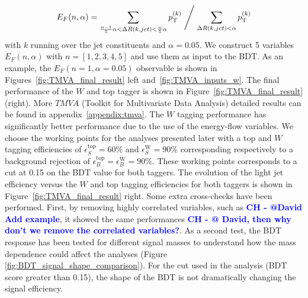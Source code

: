 \documentclass[a4paper,11pt]{article}
\newcommand{\CH}[1] {\textbf{\textcolor{blue}{CH - #1}}}
\newcommand{\ptSup}[1]{\ensuremath{p_{\text{T}}^{#1}}}
\begin{document}
\begin{equation}
E_{F}(n,\alpha) =  \sum \limits_{\frac{n-1}{5}\alpha < \Delta R(k,jet)< \frac{n}{5}\alpha} \ptSup{(k)} \Biggm/ \sum \limits_{\Delta R(k,jet)< \alpha} \ptSup{(k)}
\end{equation}
with $k$ running over the jet constituents and $\alpha=0.05$. We construct 5 variables $E_{F}(n,\alpha)$ with $n=[1,2,3,4,5]$ and use them as input to the BDT.
As an example, the $E_{F}(n=1,\alpha=0.05)$ observable is shown in Figures~\ref{fig:TMVA_final_result} left and~\ref{fig:TMVA_inputs_w}.
The final performance of the $W$ and top tagger is shown in Figure~\ref{fig:TMVA_final_result} (right). More $TMVA$ (Toolkit for Multivariate Data Analysis) detailed results can be found in appendix~\ref{appendix:tmva}.
The $W$ tagging performance has significantly better performance due to the use of the energy-flow variables. We choose the working points for the analyses presented later with a top and $W$ tagging efficiencies of $\epsilon_S^{\text{top}}=60\%$ and $\epsilon_S^{\text{W}}=90\%$ corresponding respectively to a background rejection of $\epsilon_B^{\text{top}}=\epsilon_B^{\text{W}}=90\%$. These working points corresponds to a cut at 0.15 on the BDT value for both taggers. The evolution of the light jet efficiency versus the $W$ and top tagging efficiencies for both taggers is shown in Figure~\ref{fig:TMVA_final_result} right.
\newline
Some extra cross-checks have been performed. First, by removing highly correlated variables, such as \CH{@David Add example}, it showed the same performances \CH{@ David, then why don't we remove the correlated variables?}.
As a second test, the BDT response has been tested for different signal masses to understand how the mass dependence could affect the analyses (Figure \ref{fig:BDT_signal_shape_comparison}). For the cut used in the analysis (BDT score greater than 0.15), the shape of the BDT is not dramatically changing the signal efficiency.%
\end{document}
